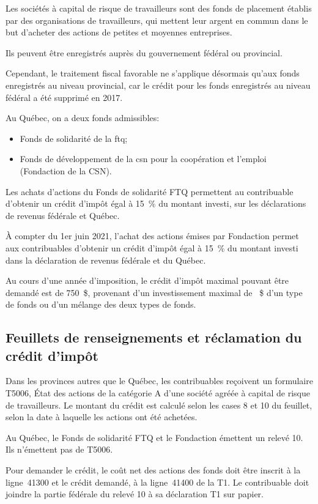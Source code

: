 Les sociétés à capital de risque de travailleurs sont des fonds de placement établis par des organisations de travailleurs, qui mettent leur argent en commun dans le but d'acheter des actions de petites et moyennes entreprises.

Ils peuvent être enregistrés auprès du gouvernement fédéral ou provincial.

Cependant, le traitement fiscal favorable ne s'applique désormais qu'aux fonds enregistrés au niveau provincial, car le crédit pour les fonds enregistrés au niveau fédéral a été supprimé en 2017.

Au Québec, on a deux fonds admissibles:
\begin{itemize}
	\item Fonds de solidarité de la \acrfull{ftq};
	\item Fonds de développement de la \acrfull{csn} pour la coopération et l'emploi (Fondaction de la CSN).
\end{itemize}

Les achats d'actions du Fonds de solidarité FTQ permettent au contribuable d'obtenir un crédit d'impôt égal à 15~\% du montant investi, sur les déclarations de revenus fédérale et Québec.

À compter du 1er juin 2021, l'achat des actions émises par Fondaction permet aux contribuables d'obtenir un crédit d'impôt égal à 15~\% du montant investi dans la déclaration de revenus fédérale et du Québec. 

Au cours d'une année d'imposition, le crédit d'impôt maximal pouvant être demandé est de 750~\$, provenant d'un investissement maximal de ~\$ d'un type de fonds ou d'un mélange des deux types de fonds.


\subsection{Feuillets de renseignements et réclamation du crédit d'impôt}
Dans les provinces autres que le Québec, les contribuables reçoivent un formulaire T5006, État des actions de la catégorie A d'une société agréée à capital de risque de travailleurs. Le montant du crédit est calculé selon les cases 8 et 10 du feuillet, selon la date à laquelle les actions ont été achetées.

Au Québec, le Fonds de solidarité FTQ et le Fondaction émettent un relevé 10. Ils n'émettent pas de T5006.

Pour demander le crédit, le coût net des actions des fonds doit être inscrit à la ligne~41300 et le crédit demandé, à la ligne~41400 de la T1. Le contribuable doit joindre la partie fédérale du relevé 10 à sa déclaration T1 sur papier. 

